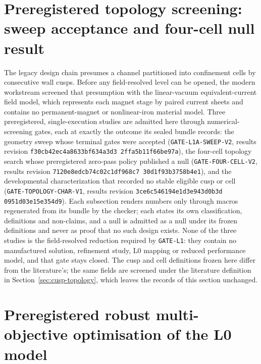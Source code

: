\documentclass[11pt]{article}
\newcommand{\SweepEvidenceRevision}{\texttt{f30cb42e\allowbreak{}c4a8633b\allowbreak{}f634a3d3\allowbreak{}%
2ffa5b11\allowbreak{}f66be97a}}
\newcommand{\FourCellEvidenceRevision}{\texttt{7120e8ed\allowbreak{}cb74c02c\allowbreak{}1df968c7\allowbreak{}%
30d1f93b\allowbreak{}3758b4e1}}
\newcommand{\CharacterizationEvidenceRevision}{\texttt{3ce6c546\allowbreak{}194e1d3e\allowbreak{}943d0b3d\allowbreak{}%
0951d03e\allowbreak{}15e354d9}}
\begin{document}


\section{Preregistered topology screening: sweep acceptance and four-cell null result}
\label{sec:topology-screening}

The legacy design chain presumes a channel partitioned into confinement cells
by consecutive wall cusps. Before any field-resolved level can be opened, the
modern workstream screened that presumption with the linear-vacuum
equivalent-current field model, which represents each magnet stage by paired
current sheets and contains no permanent-magnet or nonlinear-iron material
model. Three preregistered, single-execution studies are admitted here through
numerical-screening gates, each at exactly the outcome its sealed bundle
records: the geometry sweep whose terminal gates were accepted
(\texttt{GATE-L1A-SWEEP-V2}, results revision \SweepEvidenceRevision), the
four-cell topology search whose preregistered zero-pass policy published a
null (\texttt{GATE-FOUR-CELL-V2}, results revision \FourCellEvidenceRevision),
and the developmental characterization that recorded no stable eligible cusp
or cell (\texttt{GATE-TOPOLOGY-CHAR-V1}, results revision
\CharacterizationEvidenceRevision). Each subsection renders numbers only
through macros regenerated from its bundle by the checker; each states its
own classification, definitions and non-claims, and a null is admitted as a
null under its frozen definitions and never as proof that no such design
exists. None of the three studies is the field-resolved reduction required by
\texttt{GATE-L1}: they contain no manufactured solution, refinement study,
L0 mapping or reduced performance model, and that gate stays closed. The cusp
and cell definitions frozen here differ from the literature's; the same fields
are screened under the literature definition in
Section~\ref{sec:cusp-topology}, which leaves the records of this section
unchanged.







\section{Preregistered robust multi-objective optimisation of the L0 model}
\label{sec:mdo-l0}
\end{document}
